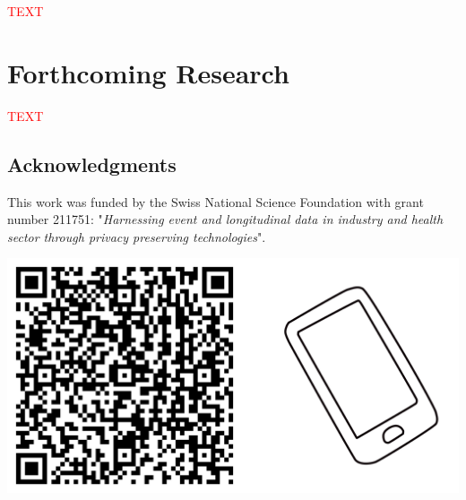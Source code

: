 \documentclass[a0,portrait]{a0poster}
\begin{document}
\begin{multicols}{3}
\begin{tcolorbox}[width=0.95\linewidth,colback={conclusion},frame empty,boxsep=1cm]
\textcolor{red}{TEXT} 

\end{tcolorbox}    

\section{Forthcoming Research}

\textcolor{red}{TEXT} 

\subsection{Acknowledgments}
\normalsize
This work was funded by the Swiss National Science Foundation with grant number 211751: "\textit{Harnessing event and longitudinal data in industry and health sector through privacy preserving technologies}".

\singlespacing
\small
\nocite{*} %

\includegraphics[width=1\linewidth]{Poster TEX/style/qr-code.png}
 
\end{multicols}
\end{document}
